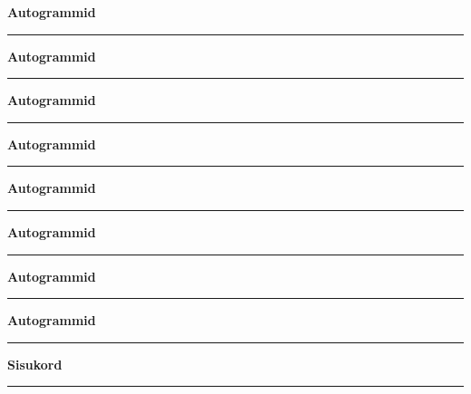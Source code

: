 \documentclass[10pt]{book}
\begin{document}
\vspace{-0.05in}
\pagebreak[3]
\null
\clearpage
{
  \samepage
  \raggedbottom
  \raggedright
  \sloppy
  \centerline{ {\bf {\large Autogrammid}}}
  \vspace{0.1in}
  \hrule height 0.05ex
}\null
\clearpage
{
  \samepage
  \raggedbottom
  \raggedright
  \sloppy
  \centerline{ {\bf {\large Autogrammid}}}
  \vspace{0.1in}
  \hrule height 0.05ex
}\null
\clearpage
{
  \samepage
  \raggedbottom
  \raggedright
  \sloppy
  \centerline{ {\bf {\large Autogrammid}}}
  \vspace{0.1in}
  \hrule height 0.05ex
}\null
\clearpage
{
  \samepage
  \raggedbottom
  \raggedright
  \sloppy
  \centerline{ {\bf {\large Autogrammid}}}
  \vspace{0.1in}
  \hrule height 0.05ex
}\null
\clearpage
{
  \samepage
  \raggedbottom
  \raggedright
  \sloppy
  \centerline{ {\bf {\large Autogrammid}}}
  \vspace{0.1in}
  \hrule height 0.05ex
}\null
\clearpage
{
  \samepage
  \raggedbottom
  \raggedright
  \sloppy
  \centerline{ {\bf {\large Autogrammid}}}
  \vspace{0.1in}
  \hrule height 0.05ex
}\null
\clearpage
{
  \samepage
  \raggedbottom
  \raggedright
  \sloppy
  \centerline{ {\bf {\large Autogrammid}}}
  \vspace{0.1in}
  \hrule height 0.05ex
}\null
\clearpage
{
  \samepage
  \raggedbottom
  \raggedright
  \sloppy
  \centerline{ {\bf {\large Autogrammid}}}
  \vspace{0.1in}
  \hrule height 0.05ex
}

\begin{flushleft}
\begin{onecolumn}
  {
    \sloppy
    \centerline{ {\bf {\large Sisukord } } }
    \vspace{0.1in}
    \hrule height 0.05ex
  }
\printindex
\end{onecolumn}
\end{flushleft}
\end{document}
